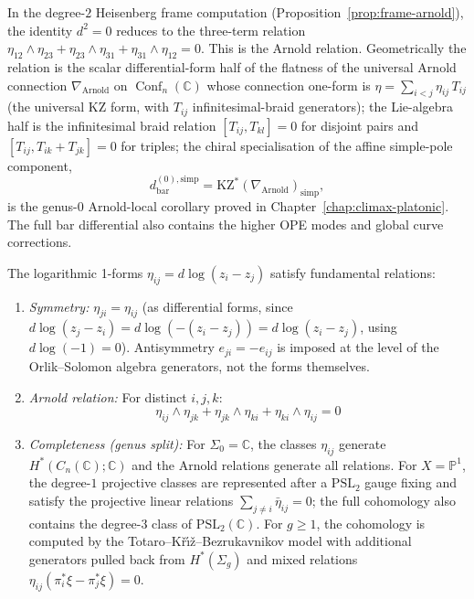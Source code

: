 \begin{theorem}\label{thm:arnold-relations}
In the degree-$2$ Heisenberg frame computation
\textup{(}Proposition~\textup{\ref{prop:frame-arnold}}\textup{)}, the
identity $d^2 = 0$ reduces to the three-term relation
$\eta_{12} \wedge \eta_{23} + \eta_{23} \wedge \eta_{31}
+ \eta_{31} \wedge \eta_{12} = 0$. This is the Arnold relation.
Geometrically the relation is the scalar differential-form half of the
flatness of the universal Arnold connection
$\nabla_{\mathrm{Arnold}}$ on $\operatorname{Conf}_n(\mathbb{C})$
whose connection one-form is $\eta = \sum_{i<j} \eta_{ij}\,T_{ij}$
(the universal KZ form, with $T_{ij}$ infinitesimal-braid generators);
the Lie-algebra half is the infinitesimal braid relation
$[T_{ij},T_{kl}]=0$ for disjoint pairs and
$[T_{ij},T_{ik}+T_{jk}]=0$ for triples;
the chiral specialisation of the affine simple-pole component,
\[
d_{\mathrm{bar}}^{(0),\mathrm{simp}}
=
\mathrm{KZ}^{*}(\nabla_{\mathrm{Arnold}})_{\mathrm{simp}},
\]
is the genus-$0$ Arnold-local corollary proved in
Chapter~\ref{chap:climax-platonic}. The full bar differential also
contains the higher OPE modes and global curve corrections.

The logarithmic 1-forms $\eta_{ij} = d\log(z_i - z_j)$ satisfy fundamental relations:

\begin{enumerate}
\item \emph{Symmetry:} $\eta_{ji} = \eta_{ij}$ (as differential forms, since $d\log(z_j - z_i) = d\log(-(z_i-z_j)) = d\log(z_i-z_j)$, using $d\log(-1)=0$). Antisymmetry $e_{ji} = -e_{ij}$ is imposed at the level of the Orlik--Solomon algebra generators, not the forms themselves.

\item \emph{Arnold relation:} For distinct $i,j,k$:
\[\eta_{ij} \wedge \eta_{jk} + \eta_{jk} \wedge \eta_{ki} + \eta_{ki} \wedge \eta_{ij} = 0\]

\item \emph{Completeness (genus split):} For $\Sigma_0 = \mathbb{C}$, the
classes $\eta_{ij}$ generate $H^*(C_n(\mathbb{C}); \mathbb{C})$ and the
Arnold relations generate all relations. For $X = \mathbb{P}^1$, the
degree-$1$ projective classes are represented after a
$\mathrm{PSL}_2$ gauge fixing and satisfy the projective linear
relations $\sum_{j \neq i}\bar\eta_{ij} = 0$; the full cohomology also
contains the degree-$3$ class of $\mathrm{PSL}_2(\mathbb{C})$. For
$g \geq 1$, the cohomology is computed by the
Totaro--K\v{r}\'{\i}\v{z}--Bezrukavnikov model with additional
generators pulled back from $H^*(\Sigma_g)$ and mixed relations
$\eta_{ij}(\pi_i^*\xi-\pi_j^*\xi)=0$.
\end{enumerate}
\end{theorem}

